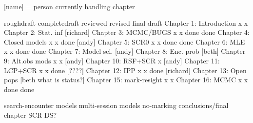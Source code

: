 [name] = person currently handling chapter


                          roughdraft   completedraft  reviewed  revised  final draft
Chapter 1: Introduction       x              x
Chapter 2: Stat. inf        [richard]
Chapter 3: MCMC/BUGS          x              x         done      done
Chapter 4: Closed models      x              x         done     [andy]
Chapter 5: SCR0               x              x         done      done
Chapter 6: MLE                x              x         done      done
Chapter 7: Model sel.       [andy]
Chapter 8: Enc. prob        [beth]
Chapter 9: Alt.obs mods       x              x         [andy]
Chapter 10: RSF+SCR           x           [andy]
Chapter 11: LCP+SCR           x              x         done     [????]
Chapter 12: IPP               x              x         done     [richard]
Chapter 13: Open pops       [beth what is status?]
Chapter 15: mark-resight      x              x        
Chapter 16: MCMC              x              x         done      done


search-encounter models
multi-session models
no-marking 
conclusions/final chapter
SCR-DS?


